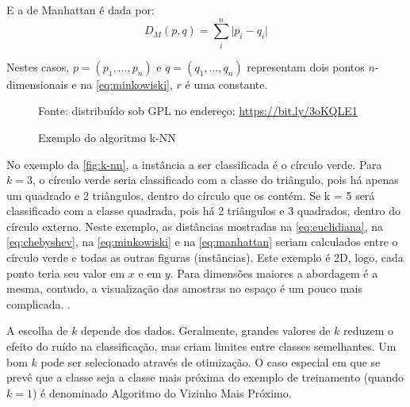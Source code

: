 E a de Manhattan é dada por:
\begin{equation}\label{eq:manhattan}
D_M(p,q) = \sum_{i}^{n} \big| p_i - q_i \big| 
\end{equation}

Nestes casos, $ p = (p_1, \dots, p_n)$ e $ q = (q_1, \dots, q_n) $ representam dois pontos $n$-dimensionais e na \autoref{eq:minkowiski}, $r$ é uma constante.

\begin{figure}[h!]
	\centering
	\caption{Exemplo do algoritmo k-NN}
	
	{\scriptsize Fonte: distribuído sob GPL no endereço: \href{https://bit.ly/3oKQLE1}{https://bit.ly/3oKQLE1} }
	\label{fig:k-nn}
\end{figure}

No exemplo da \autoref{fig:k-nn},  a instância a ser classificada é o círculo verde. Para $k = 3$, o círculo verde seria classificado com a classe do triângulo, pois há apenas um quadrado e 2 triângulos, dentro do círculo que os contém. Se k = 5 será classificado com a classe quadrada, pois há 2 triângulos e 3 quadrados, dentro do círculo externo. Neste exemplo, as distâncias mostradas na \autoref{eq:euclidiana}, na \autoref{eq:chebyshev}, na \autoref{eq:minkowiski} e na \autoref{eq:manhattan} seriam calculados entre o círculo verde e todas as outras figuras (instâncias). Este exemplo é 2D, logo, cada ponto teria seu valor em $x$ e em $y$. Para dimensões maiores a abordagem é a mesma, contudo, a visualização das amostras no espaço é um pouco mais complicada. \cite{Boscarioli2017} \cite{data_science_do_zero2016} \cite{goldschmidt2005}.

A escolha de $k$ depende dos dados. Geralmente, grandes valores de $k$ reduzem o efeito do ruído na classificação, mas criam limites entre classes semelhantes. Um bom $k$ pode ser selecionado através de otimização. O caso especial em que se prevê que a classe seja a classe mais próxima do exemplo de treinamento (quando  $k = 1$) é denominado Algoritmo do Vizinho Mais Próximo. 

